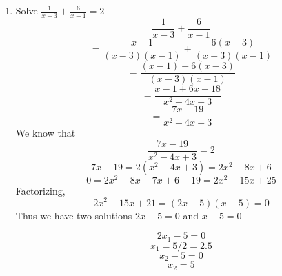 \documentclass{article}
\begin{document}
\begin{enumerate}
\begin{enumerate}
			
		\end{enumerate}
	
	\item Solve $\frac{1}{x-3} + \frac{6}{x-1} = 2$
	\[
		\frac{1}{x-3} + \frac{6}{x-1} 	
	\]
	\[
		= \frac{x-1}{(x-3)(x-1)} + \frac{6(x-3)}{(x-3)(x-1)}  
	\]
	\[
		= \frac{(x-1) + 6(x-3)}{(x-3)(x-1)} 
	\]
	\[
		= \frac{x-1+6x-18}{x^2-4x+3}
	\]
	\[
		= \frac{7x-19}{x^2-4x+3}
	\]
	We know that
	\[
		\frac{7x-19}{x^2-4x+3} = 2
	\]
	\[
		7x-19 = 2(x^2-4x+3) = 2x^2-8x+6
	\]
	\[
		0 = 2x^2-8x-7x+6+19 = 2x^2-15x+25
	\]
	Factorizing,
	\[
		2x^2-15x+21 = (2x-5)(x-5) = 0
	\]
	Thus we have two solutions $2x-5 = 0$ and $x-5=0$
	
	\[
		2x_1-5 = 0
	\]
	\[
		x_1 = 5/2 = 2.5
	\]
	\[
		x_2-5 = 0
	\]
	\[
		x_2 = 5
	\]
	
	
	
\end{enumerate}
\end{document}
